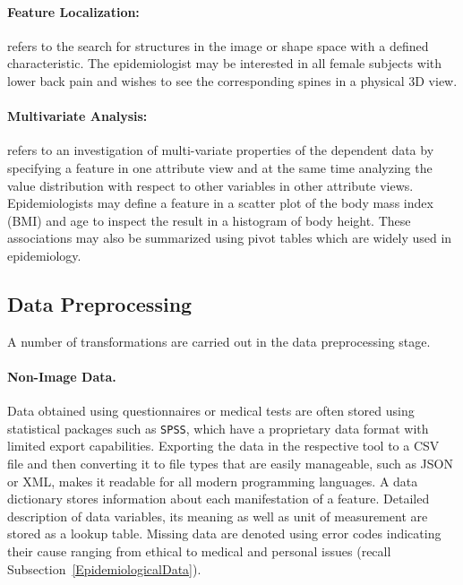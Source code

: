 \documentclass[journal]{style/vgtc} 			          %
\begin{document}
\paragraph{Feature Localization:} refers to the search for structures in the image or shape space with a defined characteristic.
%
The epidemiologist may be interested in all female subjects with lower back pain and wishes to see the corresponding spines in a physical 3D view.

\paragraph{Multivariate Analysis:} refers to an investigation of multi-variate properties of the dependent data by specifying a feature in one attribute view and at the same time analyzing the value distribution with respect to other variables in other attribute views.
%
Epidemiologists may define a feature in a scatter plot of the body mass index (BMI) and age to inspect the result in a histogram of body height.
%
These associations may also be summarized using pivot tables which are widely used in epidemiology.

\subsection{Data Preprocessing} \label{Data Preprocessing}
A number of transformations are carried out in the data preprocessing stage.
\paragraph{Non-Image Data. }
%
%
Data obtained using questionnaires or medical tests are often stored using statistical packages such as \texttt{SPSS}, which have a proprietary data format with limited export capabilities.
%
Exporting the data in the respective tool to a CSV file and then converting it to file types that are easily manageable, such as JSON or XML, makes it readable for all modern programming languages.
%
%
A data dictionary stores information about each manifestation of a feature.
%
Detailed description of data variables, its meaning as well as unit of measurement are stored as a lookup table.
%
%
Missing data are denoted using error codes indicating their cause ranging from ethical to medical and personal issues (recall Subsection~\ref{EpidemiologicalData}).
%
\end{document}
